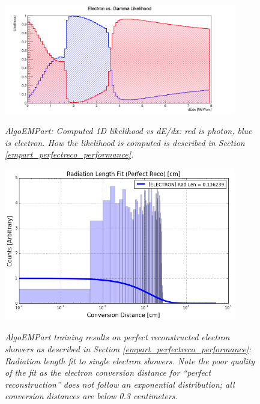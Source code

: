 \begin{figure}[ht!]
\centering
\includegraphics[width=0.9\textwidth]{Figures/EMPartTraining/mc_trained/Likelihood_dEdx.png}\\
\caption{\textit{AlgoEMPart: Computed 1D likelihood vs dE/dx: red is photon, blue is electron. How the likelihood is computed is described in Section \ref{empart_perfectreco_performance}.}}
\label{empart_perfectreco_performance_fig4}
\end{figure}


\begin{figure}[ht!]
\centering
\includegraphics[width=0.9\textwidth]{Figures/EMPartTraining/mc_trained/RadLength_Selected_e.png}\\
\caption{\textit{AlgoEMPart training results on perfect reconstructed electron showers as described in Section \ref{empart_perfectreco_performance}: Radiation length fit to single electron showers. Note the poor quality of the fit as the electron conversion distance for ``perfect reconstruction'' does not follow an exponential distribution; all conversion distances are below 0.3 centimeters.}}
\label{empart_perfectreco_performance_fig6}
\end{figure}

